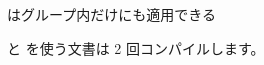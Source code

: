\documentclass[a4paper,11pt]{ltjsarticle}
\begin{document}
\vspace{7mm}

\begin{ExamplePanel}{\texttt{\string\KKchemsetup} はグループ内だけにも適用できる}
  \begin{center}
    \hspace{6em}
    \begingroup
    \endgroup
  \end{center}
\end{ExamplePanel}

\vspace{5mm}
\begin{center}
  \small
  \texttt{\string\KKchemmark} と \texttt{\string\KKhbond} を使う文書は 2 回コンパイルします。
\end{center}
\end{document}
